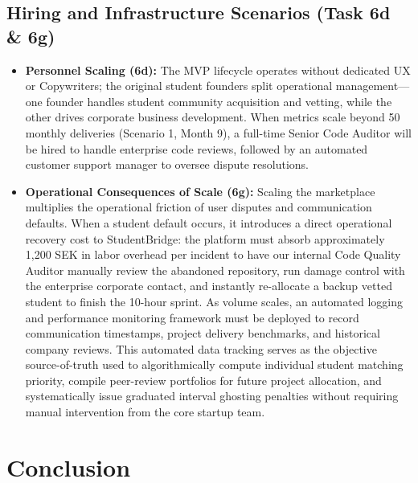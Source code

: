 \documentclass[12pt,a4paper]{article}
\begin{document}
\subsection{Hiring and Infrastructure Scenarios (Task 6d \& 6g)}

\begin{itemize}
    \item \textbf{Personnel Scaling (6d):} The MVP lifecycle operates without dedicated UX or Copywriters; the original student founders split operational management---one founder handles student community acquisition and vetting, while the other drives corporate business development. When metrics scale beyond 50 monthly deliveries (Scenario 1, Month 9), a full-time Senior Code Auditor will be hired to handle enterprise code reviews, followed by an automated customer support manager to oversee dispute resolutions.
    \item \textbf{Operational Consequences of Scale (6g):} Scaling the marketplace multiplies the operational friction of user disputes and communication defaults. When a student default occurs, it introduces a direct operational recovery cost to StudentBridge: the platform must absorb approximately 1,200 SEK in labor overhead per incident to have our internal Code Quality Auditor manually review the abandoned repository, run damage control with the enterprise corporate contact, and instantly re-allocate a backup vetted student to finish the 10-hour sprint. As volume scales, an automated logging and performance monitoring framework must be deployed to record communication timestamps, project delivery benchmarks, and historical company reviews. This automated data tracking serves as the objective source-of-truth used to algorithmically compute individual student matching priority, compile peer-review portfolios for future project allocation, and systematically issue graduated interval ghosting penalties without requiring manual intervention from the core startup team.
\end{itemize}

\section{Conclusion}
\end{document}
